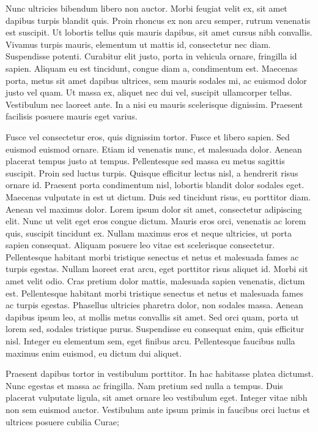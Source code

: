 \documentclass{article}
\begin{document}
Nunc ultricies bibendum libero non auctor. Morbi feugiat velit ex, sit amet dapibus turpis blandit quis. Proin rhoncus ex non arcu semper, rutrum venenatis est suscipit. Ut lobortis tellus quis mauris dapibus, sit amet cursus nibh convallis. Vivamus turpis mauris, elementum ut mattis id, consectetur nec diam. Suspendisse potenti. Curabitur elit justo, porta in vehicula ornare, fringilla id sapien. Aliquam eu est tincidunt, congue diam a, condimentum est. Maecenas porta, metus sit amet dapibus ultrices, sem mauris sodales mi, ac euismod dolor justo vel quam. Ut massa ex, aliquet nec dui vel, suscipit ullamcorper tellus. Vestibulum nec laoreet ante. In a nisi eu mauris scelerisque dignissim. Praesent facilisis posuere mauris eget varius.

Fusce vel consectetur eros, quis dignissim tortor. Fusce et libero sapien. Sed euismod euismod ornare. Etiam id venenatis nunc, et malesuada dolor. Aenean placerat tempus justo at tempus. Pellentesque sed massa eu metus sagittis suscipit. Proin sed luctus turpis. Quisque efficitur lectus nisl, a hendrerit risus ornare id. Praesent porta condimentum nisl, lobortis blandit dolor sodales eget. Maecenas vulputate in est ut dictum. Duis sed tincidunt risus, eu porttitor diam. Aenean vel maximus dolor.
Lorem ipsum dolor sit amet, consectetur adipiscing elit. Nunc ut velit eget eros congue dictum. Mauris eros orci, venenatis ac lorem quis, suscipit tincidunt ex. Nullam maximus eros et neque ultricies, ut porta sapien consequat. Aliquam posuere leo vitae est scelerisque consectetur. Pellentesque habitant morbi tristique senectus et netus et malesuada fames ac turpis egestas. Nullam laoreet erat arcu, eget porttitor risus aliquet id. Morbi sit amet velit odio. Cras pretium dolor mattis, malesuada sapien venenatis, dictum est. Pellentesque habitant morbi tristique senectus et netus et malesuada fames ac turpis egestas. Phasellus ultricies pharetra dolor, non sodales massa. Aenean dapibus ipsum leo, at mollis metus convallis sit amet. Sed orci quam, porta ut lorem sed, sodales tristique purus. Suspendisse eu consequat enim, quis efficitur nisl. Integer eu elementum sem, eget finibus arcu. Pellentesque faucibus nulla maximus enim euismod, eu dictum dui aliquet.

Praesent dapibus tortor in vestibulum porttitor. In hac habitasse platea dictumst. Nunc egestas et massa ac fringilla. Nam pretium sed nulla a tempus. Duis placerat vulputate ligula, sit amet ornare leo vestibulum eget. Integer vitae nibh non sem euismod auctor. Vestibulum ante ipsum primis in faucibus orci luctus et ultrices posuere cubilia Curae;
\end{document}
